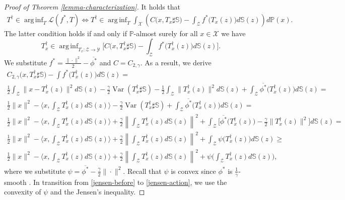 \documentclass{article} %
\DeclareMathOperator*{\arginf}{arg\,inf}
\DeclareMathOperator{\Var}{Var}
\begin{document}
\begin{proof}[Proof of Theorem \ref{lemma-characterization}]It holds that
\begin{eqnarray}
    T^{\dagger}\in\arginf_{T}\mathcal{L}(f^{*},T)\Leftrightarrow T^{\dagger}\in\arginf_{T}\int_{\mathcal{X}} \left( C\big(x,T_{x}\sharp\mathbb{S}\big)-\int_{\mathcal{Z}} f^{*}\big(T_{x}(z)\big) d\mathbb{S}(z)\right) d\mathbb{P}(x).
    \nonumber
\end{eqnarray}
The latter condition holds if and only if $\mathbb{P}$-almost surely for all $x\in\mathcal{X}$ we have 
\begin{equation}T_{x}^{\dagger}\in\arginf_{T_{x}:\mathcal{Z}\rightarrow\mathcal{Y}}\big[C\big(x,T_{x}^{\dagger}\sharp\mathbb{S}\big)-\int_{\mathcal{Z}} f^{*}\big(T_{x}^{\dagger}(z)\big) d\mathbb{S}(z)\big].
\label{Tx-arginf}
\end{equation}
We substitute $f^{*}=\frac{\|\cdot\|^{2}}{2}-\overline{\phi^{*}}$ and $C=C_{2,\gamma}$. As a result, we derive
\begin{eqnarray}
    C_{2,\gamma}\big(x,T_{x}^{\dagger}\sharp\mathbb{S}\big)-\int f^{*}\big(T_{x}^{\dagger}(z)\big) d\mathbb{S}(z)=
    \nonumber
    \\
    \frac{1}{2}\int_{\mathcal{Z}}\|x-T_{x}^{\dagger}(z)\|^{2}d\mathbb{S}(z)-\frac{\gamma}{2}\Var(T_{x}^{\dagger}\sharp\mathbb{S})-\frac{1}{2}\int_{\mathcal{Z}}\|T_{x}^{\dagger}(z)\|^{2}d\mathbb{S}(z)+\int_{\mathcal{Z}}\overline{\phi^{*}}\big(T_{x}^{\dagger}(z)\big)d\mathbb{S}(z)=
    \nonumber
    \\
    \frac{1}{2}\|x\|^{2}-\langle x,\int_{\mathcal{Z}}T_{x}^{\dagger}(z)d\mathbb{S}(z)\rangle-\frac{\gamma}{2}\Var(T_{x}^{\dagger}\sharp\mathbb{S})+\int_{\mathcal{Z}}\overline{\phi^{*}}\big(T_{x}^{\dagger}(z)\big)d\mathbb{S}(z)=
    \nonumber
    \\
    \frac{1}{2}\|x\|^{2}-\langle x,\int_{\mathcal{Z}}T_{x}^{\dagger}(z)d\mathbb{S}(z)\rangle+\frac{\gamma}{2}\left\|\int_{\mathcal{Z}}T_{x}^{\dagger}(z)d\mathbb{S}(z)\right\|^{2}+\int_{\mathcal{Z}}\big[\overline{\phi^{*}}\big(T_{x}^{\dagger}(z)\big)-\frac{\gamma}{2}\|T_{x}^{\dagger}(z)\|^{2}\big]d\mathbb{S}(z)=
    \nonumber
    \\
    \frac{1}{2}\|x\|^{2}-\langle x,\int_{\mathcal{Z}}T_{x}^{\dagger}(z)d\mathbb{S}(z)\rangle+\frac{\gamma}{2}\left\|\int_{\mathcal{Z}}T_{x}^{\dagger}(z)d\mathbb{S}(z)\right\|^{2}+\int_{\mathcal{Z}}\psi\big(T_{x}^{\dagger}(z)\big)d\mathbb{S}(z)\geq
    \label{jensen-before}
    \\
    \frac{1}{2}\|x\|^{2}-\langle x,\int_{\mathcal{Z}}T_{x}^{\dagger}(z)d\mathbb{S}(z)\rangle+\frac{\gamma}{2}\left\|\int_{\mathcal{Z}}T_{x}^{\dagger}(z)d\mathbb{S}(z)\right\|^{2}+\psi\bigg(\int_{\mathcal{Z}}T_{x}^{\dagger}(z)d\mathbb{S}(z)\bigg),
    \label{jensen-action}
\end{eqnarray}
where we substitute $\psi=\overline{\phi^{*}}-\frac{\gamma}{2}\|\cdot\|^{2}$. Recall that $\psi$ is convex since $\phi^{*}$ is $\frac{1}{\gamma}$-smooth \citep{kakade2009duality}. In transition from \eqref{jensen-before} to \eqref{jensen-action}, we use the convexity of $\psi$ and the Jensen's inequality.


\end{proof}
\end{document}
